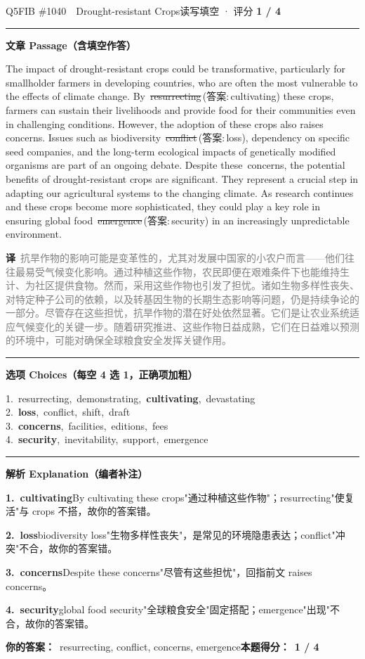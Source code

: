 \documentclass[11pt]{article}
\newcommand{\ptesub}[1]{%
  \par\needspace{2\baselineskip}\smallskip
  {\color{cAccent}\rule[-0.2ex]{3pt}{1.05em}}\hspace{6pt}%
  {\bfseries\color{cHead}#1}\par\nopagebreak\smallskip}
\newcommand{\zh}[1]{{\footnotesize\textcolor{cNote}{\textbf{译}}\ \textcolor{gray}{#1}}}
\newcommand{\rok}[1]{{\color{cFix}\ding{51}\,#1}}                 %
\newcommand{\rno}[2]{{\color{cWrong}\ding{55}\,\sout{#1}}\,{\footnotesize\color{cFix}(答案:\,#2)}}  %
\begin{document}
\begin{qblock}{Q5\quad FIB \#1040\ \ Drought-resistant Crops}{读写填空 · 评分 \textcolor{cAccent}{\bfseries 1 / 4}}
\ptesub{文章 Passage（含填空作答）}
\begin{promptbox}
The impact of drought-resistant crops could be transformative, particularly for smallholder farmers in developing countries, who are often the most vulnerable to the effects of climate change. By \rno{resurrecting}{cultivating} these crops, farmers can sustain their livelihoods and provide food for their communities even in challenging conditions. However, the adoption of these crops also raises concerns. Issues such as biodiversity \rno{conflict}{loss}, dependency on specific seed companies, and the long-term ecological impacts of genetically modified organisms are part of an ongoing debate. Despite these \rok{concerns}, the potential benefits of drought-resistant crops are significant. They represent a crucial step in adapting our agricultural systems to the changing climate. As research continues and these crops become more sophisticated, they could play a key role in ensuring global food \rno{emergence}{security} in an increasingly unpredictable environment.
\end{promptbox}
\zh{抗旱作物的影响可能是变革性的，尤其对发展中国家的小农户而言——他们往往最易受气候变化影响。通过种植这些作物，农民即便在艰难条件下也能维持生计、为社区提供食物。然而，采用这些作物也引发了担忧。诸如生物多样性丧失、对特定种子公司的依赖，以及转基因生物的长期生态影响等问题，仍是持续争论的一部分。尽管存在这些担忧，抗旱作物的潜在好处依然显著。它们是让农业系统适应气候变化的关键一步。随着研究推进、这些作物日益成熟，它们在日益难以预测的环境中，可能对确保全球粮食安全发挥关键作用。}
\ptesub{选项 Choices（每空 4 选 1，正确项加粗）}
{\small
1.\ resurrecting,\ demonstrating,\ \textbf{cultivating},\ devastating\\
2.\ \textbf{loss},\ conflict,\ shift,\ draft\\
3.\ \textbf{concerns},\ facilities,\ editions,\ fees\\
4.\ \textbf{security},\ inevitability,\ support,\ emergence}
\ptesub{解析 Explanation（编者补注）}
\begin{notebox}\footnotesize
\textbf{1.\ cultivating}\quad By cultivating these crops"通过种植这些作物"；resurrecting"使复活"与 crops 不搭，故你的答案错。\par\smallskip
\textbf{2.\ loss}\quad biodiversity loss"生物多样性丧失"，是常见的环境隐患表达；conflict"冲突"不合，故你的答案错。\par\smallskip
\textbf{3.\ concerns}\quad Despite these concerns"尽管有这些担忧"，回指前文 raises concerns。\par\smallskip
\textbf{4.\ security}\quad global food security"全球粮食安全"固定搭配；emergence"出现"不合，故你的答案错。
\end{notebox}
\smallskip
\textbf{你的答案：}\ {\color{cWrong}resurrecting, conflict}, concerns, {\color{cWrong}emergence}\qquad\textbf{本题得分：}\ {\color{cAccent}\bfseries 1 / 4}
\end{qblock}
\end{document}
